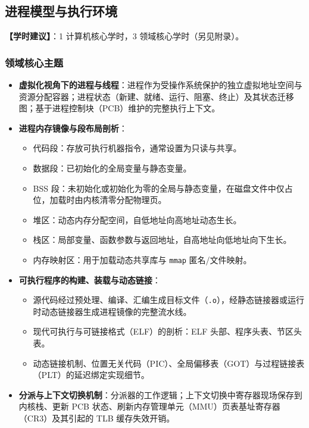 \subsection{进程模型与执行环境}
\textbf{【学时建议】}：1 计算机核心学时，3 领域核心学时（另见附录）。

\subsubsection{领域核心主题}
\begin{itemize}\setlength{\itemsep}{0pt}\setlength{\parskip}{0pt}
    \item \textbf{虚拟化视角下的进程与线程}：进程作为受操作系统保护的独立虚拟地址空间与资源分配容器；进程状态（新建、就绪、运行、阻塞、终止）及其状态迁移图；基于进程控制块（PCB）维护的完整执行上下文。
    \item \textbf{进程内存镜像与段布局剖析}：
    \begin{itemize}\setlength{\itemsep}{0pt}\setlength{\parskip}{0pt}
        \item 代码段：存放可执行机器指令，通常设置为只读与共享。
        \item 数据段：已初始化的全局变量与静态变量。
        \item BSS 段：未初始化或初始化为零的全局与静态变量，在磁盘文件中仅占位，加载时由内核清零分配物理页。
        \item 堆区：动态内存分配空间，自低地址向高地址动态生长。
        \item 栈区：局部变量、函数参数与返回地址，自高地址向低地址向下生长。
        \item 内存映射区：用于加载动态共享库与 \texttt{mmap} 匿名/文件映射。
    \end{itemize}
    \item \textbf{可执行程序的构建、装载与动态链接}：
    \begin{itemize}\setlength{\itemsep}{0pt}\setlength{\parskip}{0pt}
        \item 源代码经过预处理、编译、汇编生成目标文件（\texttt{.o}），经静态链接器或运行时动态链接器生成进程镜像的完整流水线。
        \item 现代可执行与可链接格式（ELF）的剖析：ELF 头部、程序头表、节区头表。
        \item 动态链接机制、位置无关代码（PIC）、全局偏移表（GOT）与过程链接表（PLT）的延迟绑定实现细节。
    \end{itemize}
    \item \textbf{分派与上下文切换机制}：分派器的工作逻辑；上下文切换中寄存器现场保存到内核栈、更新 PCB 状态、刷新内存管理单元（MMU）页表基址寄存器（CR3）及其引起的 TLB 缓存失效开销。

\end{itemize}
